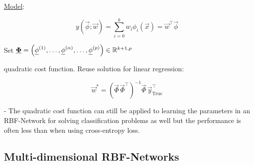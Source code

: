 \begin{frame}\frametitle{\subsecname}

\underline{Model}:
\vspace{-5mm}
\vspace{-5mm}

\begin{equation}
    y(\vec \phi; \vec w) = \sum_{i=0}^{k} w_{i} \phi_{i}(\vec x) = \vec w^{\top} \vec \phi
\end{equation}

Set $\underline{\mathbf{\Phi}} = \left( \underline{\mathbf{\phi}}^{(1)},\ldots, \underline{\mathbf{\phi}}^{(\alpha)},\ldots, \underline{\mathbf{\phi}}^{(p)}\right) \in \mathbb{R}^{k+1,p}$

quadratic cost function. \pause Reuse solution for linear regression:

\begin{equation}
\vec w^{*} = \left( \vec \Phi \, \vec \Phi^{\top}\right)^{-1} \vec \Phi \, \vec y_{\text{True}}^{\top}
\end{equation}


\pause

- The quadratic cost function can still be applied to learning the parameters in an RBF-Network for solving classification problems as well but the performance is often less than when using cross-entropy loss.

\end{frame}

\subsection{Multi-dimensional RBF-Networks}

